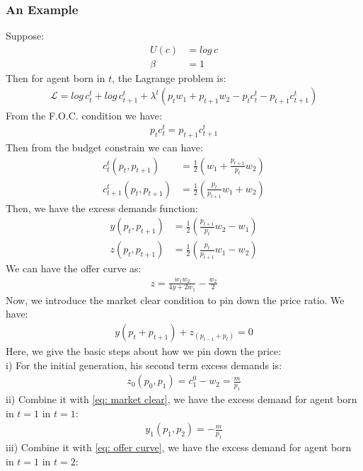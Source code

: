 \documentclass{article}
\begin{document}
\subsubsection{An Example}
Suppose:
\begin{align*}
	U(c) &= log\, c\\
	\beta &= 1
\end{align*}
Then for agent born in $t$, the Lagrange problem is:
	\begin{align*}
		\mathscr{L} = log\, c^t_t + log\, c^t_{t+1} + \lambda^t (p_t w_1 + p_{t+1} w_2 - p_t c^t_t - p_{t+1} c^t_{t+1})
	\end{align*}
From the F.O.C. condition we have:
	\begin{align*}
		p_t c^t_t = p_{t+1} c^t_{t+1}
	\end{align*}
Then from the budget constrain we can have:
	\begin{align*}
		c^t_t(p_t, p_{t+1}) &= \frac{1}{2}(w_1 + \frac{p_{t+1}}{p_t} w_2)\\
		c^t_{t+1}(p_t, p_{t+1}) &= \frac{1}{2}(\frac{p_t}{p_{t+1}} w_1 + w_2)
	\end{align*}
Then, we have the excess demands function:
	\begin{align*}
		y(p_t, p_{t+1}) &= \frac{1}{2}(\frac{p_{t+1}}{p_t} w_2 - w_1)\\
		z(p_t, p_{t+1}) &= \frac{1}{2}(\frac{p_{t}}{p_{t+1}} w_1 - w_2)
	\end{align*}
We can have the offer curve as:
	\begin{align}
		z = \frac{w_1 w_2}{4y + 2w_1} - \frac{w_2}{2} \label{eq: offer curve}
	\end{align}
Now, we introduce the market clear condition to pin down the price ratio. We have:
	\begin{align}
		y(p_t + p_{t+1}) + z_(p_{t-1} + p_{t}) = 0 \label{eq: market clear}
	\end{align}
Here, we give the basic steps about how we pin down the price:\\
\indent i) For the initial generation, his second term excess demands is:
	\begin{align*}
		z_0(p_0, p_1) = c^0_1 - w_2 = \frac{m}{p_1}
	\end{align*}
\indent ii) Combine it with \eqref{eq: market clear}, we have the excess demand for agent born in $t = 1$ in $t = 1$:
	\begin{align*}
		y_1(p_1, p_2) = -\frac{m}{p_1}
	\end{align*}
\indent iii) Combine it with \eqref{eq: offer curve}, we have the excess demand for agent born in $t = 1$ in $t = 2$:
\end{document}
